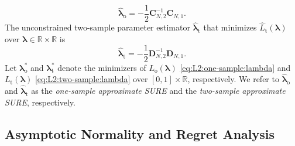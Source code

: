 \documentclass[12pt,letterpaper]{article}
\newtheorem{assumption}{Assumption}[section]
\begin{document}
\begin{equation}\label{eq:unconstrained:one-sample:optimal}
\hat{\boldsymbol\lambda}_{\mathrm{o}}=-\frac{1}{2}\mathbf{C}_{N,2}^{-1}\mathbf{C}_{N,1}.
\end{equation}
The unconstrained two-sample parameter estimator $\hat{\boldsymbol{\lambda}}_{\mathrm{t}}$ that minimizes $\hat{L}_{\mathrm{t}}(\boldsymbol{\lambda})$ over $\boldsymbol{\lambda}\in\mathbb{R}\times\mathbb{R}$ is 
\begin{equation}\label{eq:unconstrained:two-sample}
\hat{\boldsymbol{\lambda}}_{\mathrm{t}}=-\frac{1}{2}\mathbf{D}_{N,2}^{-1}\mathbf{D}_{N,1}.
\end{equation}
Let $\boldsymbol{\lambda}_{\mathrm{o}}^*$ and $\boldsymbol{\lambda}_{\mathrm{t}}^*$ denote the minimizers of $L_{\mathrm{o}}(\boldsymbol{\lambda})$ \eqref{eq:L2:one-sample:lambda} and $L_{\mathrm{t}}(\boldsymbol{\lambda})$ \eqref{eq:L2:two-sample:lambda} over $[0,1]\times\mathbb{R}$, respectively. We refer to $\hat{\boldsymbol{\lambda}}_\mathrm{o}$ and $\hat{\boldsymbol{\lambda}}_\mathrm{t}$ as the \textit{one-sample approximate SURE} and the \textit{two-sample approximate SURE}, respectively. 

\subsection{Asymptotic Normality and Regret Analysis}




\end{document}
